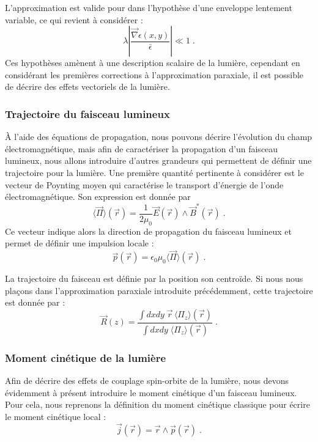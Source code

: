 \documentclass[a4paper,11pt]{article} %
\begin{document}
	L'approximation est valide pour dans l'hypothèse d'une enveloppe lentement variable, ce qui revient à considérer :
	\begin{equation*}
		\lambda \left| \frac{\vec{\nabla}\epsilon(x,y)}{\bar{\epsilon}} \right| \ll 1 \; .
	\end{equation*}
	Ces hypothèses amènent à une description scalaire de la lumière, cependant en considérant les premières corrections à l'approximation paraxiale, il est possible de décrire des effets vectoriels de la lumière.
	
	
	\subsubsection{Trajectoire du faisceau lumineux}
	\`A l'aide des équations de propagation, nous pouvons décrire l'évolution du champ électromagnétique, mais afin de caractériser la propagation d'un faisceau lumineux, nous allons introduire d'autres grandeurs qui permettent de définir une trajectoire pour la lumière. Une première quantité pertinente à considérer est le vecteur de Poynting moyen qui caractérise le transport d'énergie de l'onde électromagnétique. Son expression est donnée par
	\begin{equation*}
		\langle \vec{\Pi} \rangle (\vec{r}) = \frac{1}{2 \mu_0} \vec{E}(\vec{r}) \wedge \vec{B}^*(\vec{r}) \; .
	\end{equation*}
	Ce vecteur indique alors la direction de propagation du faisceau lumineux et permet de définir une impulsion locale :
	\begin{equation*}
		\vec{p}(\vec{r}) = \epsilon_0 \mu_0 \langle \vec{\Pi} \rangle (\vec{r}) \; .
	\end{equation*}

	La trajectoire du faisceau est définie par la position son centroïde. Si nous nous plaçons dans l'approximation paraxiale introduite précédemment, cette trajectoire est donnée par :
	\begin{equation*}
		\vec{R}(z) = \frac{ \int \! dx dy \; \vec{r} \, \langle \Pi_z \rangle (\vec{r})}{\int \! dx dy \; \langle \Pi_z \rangle (\vec{r}) } \; .
	\end{equation*}
	
	
	\subsubsection{Moment cinétique de la lumière}
	Afin de décrire des effets de couplage spin-orbite de la lumière, nous devons évidemment à présent introduire le moment cinétique d'un faisceau lumineux. Pour cela, nous reprenons la définition du moment cinétique classique pour écrire le moment cinétique local :
	\begin{equation*}
		\vec{j}(\vec{r}) = \vec{r} \wedge \vec{p}(\vec{r}) \; .
	\end{equation*}
	
\end{document}
